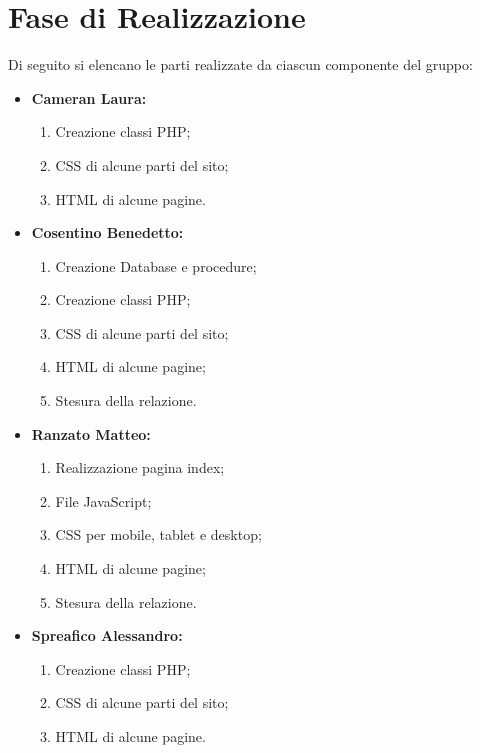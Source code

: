 \section{Fase di Realizzazione}
Di seguito si elencano le parti realizzate da
ciascun componente del gruppo:
\begin{itemize}
	\item \textbf{Cameran Laura:}
	\begin{enumerate}
		\item Creazione classi PHP;
		\item CSS di alcune parti del sito;
		\item HTML di alcune pagine.
	\end{enumerate}
	\item \textbf{Cosentino Benedetto:}
	\begin{enumerate}
		\item Creazione Database e procedure;
		\item Creazione classi PHP;
		\item CSS di alcune parti del sito;
		\item HTML di alcune pagine;
		\item Stesura della relazione.
	\end{enumerate}
	\item \textbf{Ranzato Matteo:}
	\begin{enumerate}
		\item Realizzazione pagina index;
		\item File JavaScript;
		\item CSS per mobile, tablet e desktop;
		\item HTML di alcune pagine;
		\item Stesura della relazione.
	\end{enumerate}
	\item \textbf{Spreafico Alessandro:}
	\begin{enumerate}
		\item Creazione classi PHP;
		\item CSS di alcune parti del sito;
		\item HTML di alcune pagine.
	\end{enumerate}
\end{itemize}